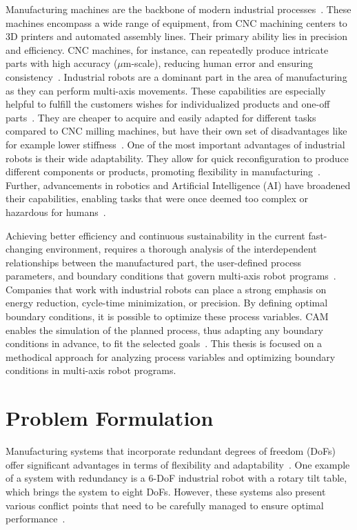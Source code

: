 Manufacturing machines are the backbone of modern industrial processes~\cite{Bi.2020}. These machines encompass a wide range of equipment, from \acrshort{CNC} machining centers to 3D printers and automated assembly lines. Their primary ability lies in precision  and efficiency. \acrshort{CNC} machines, for instance, can repeatedly produce intricate parts with high accuracy ($\mu$m-scale), reducing human error and ensuring consistency~\cite{Jia.2018,Liberman.2021}. Industrial robots are a dominant part in the area of manufacturing as they can perform multi-axis movements. These capabilities are especially helpful to fulfill the customers wishes for individualized products and one-off parts~\cite{Sherwani.2020}. They are cheaper to acquire and easily adapted for different tasks compared to \acrshort{CNC} milling machines, but have their own set of disadvantages like for example lower stiffness~\cite{Iglesias.2015, Liberman.2021}. One of the most important advantages of industrial robots is their wide adaptability. They allow for quick reconfiguration to produce different components or products, promoting flexibility in manufacturing~\cite{Billard.2019}. Further, advancements in robotics and Artificial Intelligence (\acrshort{AI}) have broadened their capabilities, enabling tasks that were once deemed too complex or hazardous for humans~\cite{Goel.2020}. 

Achieving better efficiency and continuous sustainability in the current fast-changing environment, requires a thorough analysis of the interdependent relationships between the manufactured part, the user-defined process parameters, and boundary conditions that govern multi-axis robot programs~\cite{Pan, Gadaleta.2019}. Companies that work with industrial robots can place a strong emphasis on energy reduction, cycle-time minimization, or precision. By defining optimal boundary conditions, it is possible to optimize these process variables. \acrshort{CAM} enables the simulation of the planned process, thus adapting any boundary conditions in advance, to fit the selected goals~\cite{Kyratsis.2020,Maiti.2017,Pan,Uhlmann.2016}.
This thesis is focused on a methodical approach for analyzing process variables and optimizing boundary conditions in multi-axis robot programs. 

\section{Problem Formulation}\label{Problem Formulation}
Manufacturing systems that incorporate redundant degrees of freedom (\acrshort{DoF}s) offer significant advantages in terms of flexibility and adaptability~\cite{Anjum.2022}. One example of a system with redundancy is a 6-\acrshort{DoF} industrial robot with a rotary tilt table, which brings the system to eight \acrshort{DoF}s. However, these systems also present various conflict points that need to be carefully managed to ensure optimal performance~\cite{Boscariol.2020}.


